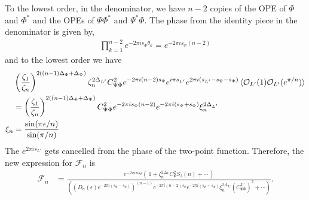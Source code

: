 \documentclass[11pt]{article}
\newcommand{\ep}{\epsilon}
\newcommand{\mO}{\mathcal{O}}
\newcommand{\nn}{\nonumber}
\newcommand{\lb}{\left(}
\newcommand{\rb}{\right)}
\newcommand{\JM}[1]{\textcolor{orange}{#1}}
\begin{document}
To the lowest order, in the denominator, we have $n-2$ copies of the OPE of $\Phi$ and $\Phi^*$ and the OPEs of $\Psi\Phi^*$ and $\Psi^*\Phi$. 
The phase from the identity piece in the denominator is given by,
\begin{align}
  \prod_{k=1}^{n-2}e^{-2\pi i s_\Phi\theta_k}=e^{-2\pi i s_\Phi(n-2)}
\end{align}
and to the lowest order we have
\begin{align}
  &\lb \frac{\zeta_1}{\zeta_n}\rb^{2((n-1)\Delta_\Phi+\Delta_\Psi)}\zeta_n^{2\Delta_{L'}}C_{\Psi\Phi}^2 e^{-2\pi i (n-2)s_\Phi} e^{i\pi s_{L'}}e^{2 \pi i (s_{L'} - s_\Psi - s_\Phi)}\braket{\mO_{L'}(1)\mO_{L'}(e^{\pi/n})}\nn\\
  &=\lb \frac{\zeta_1}{\zeta_n}\rb^{2((n-1)\Delta_\Phi+\Delta_\Psi)}C_{\Psi\Phi}^2e^{-2\pi i s_\Phi(n-2)}e^{-2 \pi i( s_\Psi + s_\Phi)}\xi_n^{2\Delta_{L'}}\nn\\
  \xi_n&=\frac{\sin(\pi \ep/n)}{\sin(\pi/n)}
\end{align}
The $e^{2\pi i s_{L'}}$ gets cancelled from the phase of the two-point function.
   Therefore, the new expression for $\mathcal{F}_n$ is
\begin{align}
    \label{eq:F_n_1_minus_x}
    \mathcal{F}_{n}&=\frac{e^{-2\pi i n s_\Psi}\lb \,1+\zeta_n^{2\Delta_L}C_\Psi^2 S_2(n)+\cdots\,\rb}{\lb \lb D_n(\ep)e^{-2\pi i (s_\Psi-s_\Phi)} \rb^{(n-1)}e^{-2\pi i (n-2)s_\Phi}e^{-2 \pi i( s_\Psi + s_\Phi)}\xi_n^{2\Delta_{L'}}(C^{L'}_{\Psi\Phi})^2 +\cdots\rb}.
\end{align}
\end{document}
